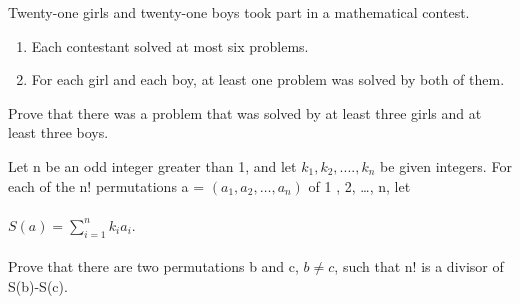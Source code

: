

\item Twenty-one girls and twenty-one boys took part in a mathematical contest.
\begin{enumerate}
 \item Each contestant solved at most six problems.
 \item For each girl and each boy, at least one problem was solved by both of them.
\end{enumerate}
 Prove that there was a problem that was solved by at least three girls and at least three boys.\\

\item Let n be an odd integer greater than 1, and let $k_1, k_2,...., k_n$ be given integers. For each of the n! permutations a = $(a_1, a_2, …, a_n)$ of 1 , 2, …, n, let\\
\\ $S(a)=\sum_{i=1}^{n} k_ia_i$.\\
\\ Prove that there are two permutations b and c, $b \neq c$, such that n! is a divisor of S(b)-S(c).


